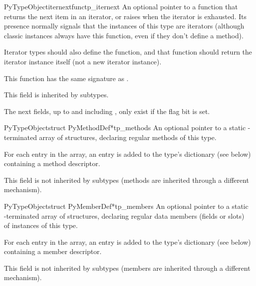 \begin{cmemberdesc}{PyTypeObject}{iternextfunc}{tp_iternext}
  An optional pointer to a function that returns the next item in an
  iterator, or raises  when the iterator is
  exhausted.  Its presence normally signals that the instances of this
  type are iterators (although classic instances always have this
  function, even if they don't define a  method).

  Iterator types should also define the  function, and
  that function should return the iterator instance itself (not a new
  iterator instance).

  This function has the same signature as .

  This field is inherited by subtypes.
\end{cmemberdesc}

The next fields, up to and including , only exist
if the  flag bit is set.

\begin{cmemberdesc}{PyTypeObject}{struct PyMethodDef*}{tp_methods}
  An optional pointer to a static \NULL-terminated array of
   structures, declaring regular methods of this
  type.

  For each entry in the array, an entry is added to the type's
  dictionary (see  below) containing a method
  descriptor.

  This field is not inherited by subtypes (methods are
  inherited through a different mechanism).
\end{cmemberdesc}

\begin{cmemberdesc}{PyTypeObject}{struct PyMemberDef*}{tp_members}
  An optional pointer to a static \NULL-terminated array of
   structures, declaring regular data members
  (fields or slots) of instances of this type.

  For each entry in the array, an entry is added to the type's
  dictionary (see  below) containing a member
  descriptor.

  This field is not inherited by subtypes (members are inherited
  through a different mechanism).
\end{cmemberdesc}

